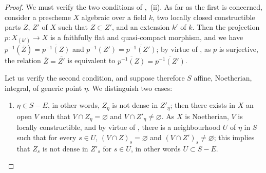 \begin{proof}
We must verify the two conditions of ,~(ii).
As far as the first is concerned, consider a prescheme $X$ algebraic over a field $k$, two locally closed constructible parts $Z$, $Z'$ of $X$ such that $Z\subset Z'$, and an extension $k'$ of $k$.
Then the projection $p:X_{(k')}\to X$ is a faithfully flat and quasi-compact morphism, and we have $p^{-1}(\overline{Z})=\overline{p^{-1}(Z)}$ and $p^{-1}(Z')=\overline{p^{-1}(Z')}$; by virtue of , as $p$ is surjective, the relation $\overline{Z}=\overline{Z'}$ is equivalent to $\overline{p^{-1}(Z)}=\overline{p^{-1}(Z')}$.

Let us verify the second condition, and suppose therefore $S$ affine, Noetherian, integral, of generic point $\eta$.
We distinguish two cases:
\begin{enumerate}[label=\upshape{$\arabic{enumi}^\circ$}]
  \item $\eta\in S-E$, in other words, $Z_\eta$ is not dense in $Z'_\eta$; then there exists in $X$ an open $V$ such that $V\cap Z_\eta=\varnothing$ and $V\cap Z'_\eta\neq\varnothing$.
  As $X$ is Noetherian, $V$ is locally constructible, and by virtue of , there is a neighbourhood $U$ of $\eta$ in $S$ such that for every $s\in U$, $(V\cap Z)_s=\varnothing$ and $(V\cap Z')_s\neq\varnothing$; this implies that $Z_s$ is not dense in $Z'_s$ for $s\in U$, in other words $U\subset S-E$.


\end{enumerate}
\end{proof}
